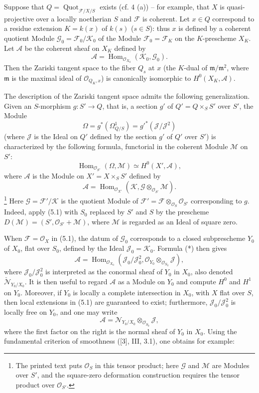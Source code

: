  Suppose that
$Q=\operatorname{Quot}_{\mathcal F/X/S}$ exists (cf. 4 (a)) -- for example,
that $X$ is quasi-projective over a locally noetherian $S$ and $\mathcal F$ is
coherent. Let $x\in Q$ correspond to a residue extension $K=k(x)$ of $k(s)$
($s\in S$):
thus $x$ is defined by a coherent quotient Module
$\mathcal G_0=\mathcal F_0/\mathcal K_0$ of the Module
$\mathcal F_0=\mathcal F_K$ on the $K$-prescheme $X_K$. Let $\mathcal A$ be the
coherent sheaf on $X_K$ defined by
\[
\mathcal A=\operatorname{Hom}_{\mathcal O_{X_0}}(\mathcal K_0,\mathcal G_0).
\]
Then the Zariski tangent space to the fiber $Q_s$ at $x$ (the $K$-dual of
$\mathfrak m/\mathfrak m^2$, where $\mathfrak m$ is the maximal ideal of
$\mathcal O_{Q_K,x}$) is canonically isomorphic to $H^0(X_K,\mathcal A)$.

The description of the Zariski tangent space admits the following
generalization. Given an $S$-morphism $g:S'\longrightarrow Q$, that is, a
section $g'$ of $Q'=Q\times_SS'$ over $S'$, the Module
\[
\Omega=g^*(\Omega^1_{Q/S})=g'^*(\mathcal J/\mathcal J^2)
\]
(where $\mathcal J$ is the Ideal on $Q'$ defined by the section $g'$ of $Q'$
over $S'$) is characterized by the following formula, functorial in the
coherent Module $\mathcal M$ on $S'$:
\[
\operatorname{Hom}_{\mathcal O_{S'}}(\Omega,\mathcal M)
\simeq H^0(X',\mathcal A),
\]
where $\mathcal A$ is the Module on $X'=X\times_SS'$ defined by
\[
\mathcal A=\operatorname{Hom}_{\mathcal O_{X'}}
(\mathcal K,\mathcal G\otimes_{\mathcal O_{S'}}\mathcal M).
\]
\footnote{The printed text puts $\mathcal O_S$ in this tensor product; here
$\mathcal G$ and $\mathcal M$ are Modules over $S'$, and the square-zero
deformation construction requires the tensor product over $\mathcal O_{S'}$.}
Here $\mathcal G=\mathcal F'/\mathcal K$ is the quotient Module of
$\mathcal F'=\mathcal F\otimes_{\mathcal O_S}\mathcal O_{S'}$ corresponding
to $g$. Indeed, apply (5.1) with $S_0$ replaced by $S'$ and $S$ by the
prescheme $D(\mathcal M)=(S',\mathcal O_{S'}+\mathcal M)$, where $\mathcal M$
is regarded as an Ideal of square zero.

When $\mathcal F=\mathcal O_X$ in (5.1), the datum of $\mathcal G_0$
corresponds to a closed subprescheme $Y_0$ of $X_0$, flat over $S_0$, defined
by the Ideal $\mathcal J_0=\mathcal K_0$. Formula (*) then gives
\[
\mathcal A=\operatorname{Hom}_{\mathcal O_{X_0}}
(\mathcal J_0/\mathcal J_0^2,
\mathcal O_{Y_0}\otimes_{\mathcal O_{S_0}}\mathcal J),
\]
where $\mathcal J_0/\mathcal J_0^2$ is interpreted as the conormal sheaf of $Y_0$
in $X_0$, also denoted
$\check{\mathcal N}_{Y_0/X_0}$. It is then useful to regard $\mathcal A$ as a
Module on $Y_0$ and compute $H^0$ and $H^1$ on $Y_0$. Moreover, if $Y_0$ is
locally a complete intersection in $X_0$, with $X$ flat over $S$, then local
extensions in (5.1) are guaranteed to exist; furthermore,
$\mathcal J_0/\mathcal J_0^2$ is locally free on $Y_0$, and one may write
\[
\mathcal A=\mathcal N_{Y_0/X_0}\otimes_{\mathcal O_{S_0}}\mathcal J,
\]
where the first factor on the right is the normal sheaf of $Y_0$ in $X_0$.
Using the fundamental criterion of smoothness ([3], III, 3.1), one obtains for
example:

